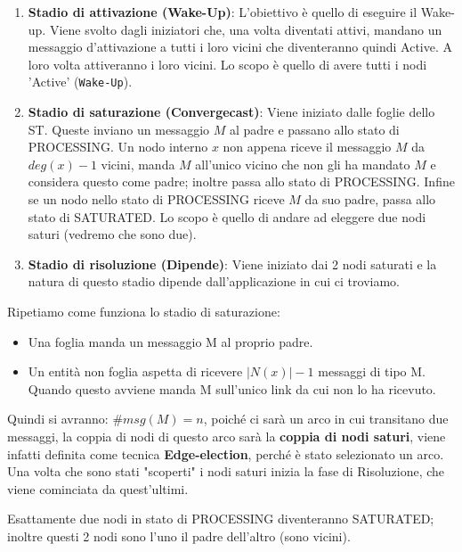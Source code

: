 \begin{enumerate}
    \item \textbf{Stadio di attivazione (Wake-Up)}: L'obiettivo è quello di
          eseguire il Wake-up. Viene svolto dagli iniziatori che, una volta diventati
          attivi, mandano un messaggio d'attivazione a tutti i loro vicini che
          diventeranno quindi Active. A loro volta attiveranno i loro vicini. Lo scopo è
          quello di avere tutti i nodi 'Active' (\texttt{Wake-Up}).
    \item \textbf{Stadio di saturazione (Convergecast)}: Viene iniziato dalle
          foglie dello ST. Queste inviano un messaggio $M$ al padre e passano allo stato
          di PROCESSING. Un nodo interno $x$ non appena riceve il messaggio $M$ da
          $deg(x) -1$ vicini, manda $M$ all'unico vicino che non gli ha mandato $M$ e
          considera questo come padre; inoltre passa allo stato di PROCESSING. Infine se
          un nodo nello stato di PROCESSING riceve $M$ da suo padre, passa allo stato di
          SATURATED. Lo scopo è quello di andare ad eleggere due nodi saturi (vedremo
          che sono due).
    \item \textbf{Stadio di risoluzione (Dipende)}: Viene iniziato dai 2 nodi
          saturati e la natura di questo stadio dipende dall'applicazione in cui
          ci troviamo.
\end{enumerate}
Ripetiamo come funziona lo stadio di saturazione:
\begin{itemize}
    \item Una foglia manda un messaggio M al proprio padre.
    \item Un entità non foglia aspetta di ricevere $|N(x)|-1$ messaggi di tipo M.
          Quando questo avviene manda M sull'unico link da cui non lo ha ricevuto.
\end{itemize}
Quindi si avranno: $\#msg(M) = n$, poiché ci sarà un arco in cui transitano due
messaggi, la coppia di nodi di questo arco sarà la \textbf{coppia di nodi
    saturi}, viene infatti definita come tecnica \textbf{Edge-election}, perché è
stato selezionato un arco. Una volta che sono stati
"scoperti" i nodi saturi inizia la fase di Risoluzione, che viene cominciata da
quest'ultimi.

\begin{theorem}
    Esattamente due nodi in stato di PROCESSING diventeranno SATURATED;
    inoltre questi 2 nodi sono l'uno il padre dell'altro (sono vicini).
\end{theorem}

